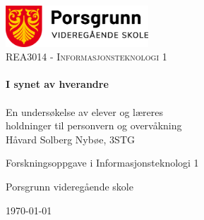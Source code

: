 \begin{titlepage}
    \vbox{ }

    \vbox{ }

    \begin{center}
        \includegraphics[width=0.40\textwidth]{img/porsgrunn-vgs.png}\\[1cm]
        \textsc{\Large REA3014 - Informasjonsteknologi 1}\\[0.6cm]

        \noindent\makebox[\linewidth]{\rule{.7\paperwidth}{.6pt}}\\[0.7cm]
        { \huge \bfseries I synet av hverandre}\\[0.25cm]
        \noindent\makebox[\linewidth]{\rule{.7\paperwidth}{.6pt}}\\[0.7cm]
        \large{En undersøkelse av elever og læreres\\ holdninger til personvern og overvåkning}\\[1.2cm]
        \vfill
        \large
        Håvard Solberg Nybøe, 3STG

        Forskningsoppgave i Informasjonsteknologi 1

        Porsgrunn videregående skole

        {\large \today}
    \end{center}
\end{titlepage}